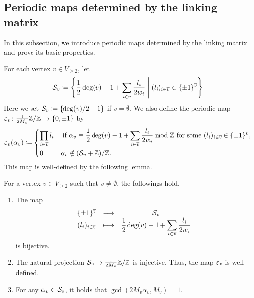 \documentclass[11pt,a4paper,lualatex]{amsart}
\numberwithin{equation}{section} %
\begin{document}
\subsection{Periodic maps determined by the linking matrix} \label{subsec:char}


In this subsection, we introduce periodic maps determined by the linking matrix and prove its basic properties.

For each vertex $ v \in V_{\ge 2} $, let 
\[
\calS_v
\coloneqq
\left\{ \frac{1}{2}\deg(v) - 1 + \sum_{i \in \overline{v}} \frac{l_i}{2w_i} \relmiddle{|} (l_i)_{i \in \overline{v}} \in \{ \pm 1 \}^{\overline{v}} \right\}
\]
Here we set $ \calS_v \coloneqq \left\{ \deg(v)/2 - 1 \right\} $ if $ \overline{v} = \emptyset $.
We also define the periodic map $ \varepsilon_v \colon \frac{1}{2M_v}\mathbb{Z}/\mathbb{Z} \to \{ 0, \pm 1 \} $ by
\[
\veps_v(\alpha_v) \coloneqq 
\begin{dcases}
	\prod_{i \in \overline{v}} l_i 
	& \text{ if } \alpha_v \equiv \frac{1}{2}\deg(v) - 1 + \sum_{i \in \overline{v}} \frac{l_i}{2w_i}  \bmod \Z 
	\text{ for some } (l_i)_{i \in \overline{v}} \in \{ \pm 1 \}^{\overline{v}}, \\
	0 & \alpha_{v} \notin (\calS_v + \Z)/\Z.
\end{dcases}
\]
This map is well-defined by the following lemma.

\begin{lem} \label{lem:bij_calS_v}
	For a vertex $ v \in V_{\ge 2} $ such that $ \overline{v} \neq \emptyset $, the followings hold. 
	\begin{enumerate}
		\item \label{item:lem:bij_calS_v1} The map
		\[
		\begin{array}{ccc}
			\{ \pm 1 \}^{\overline{v}} & \longrightarrow & \mathcal{S}_v \\
			(l_i)_{i \in \overline{v}} & \longmapsto & \displaystyle \frac{1}{2}\deg(v) - 1 + \sum_{i \in \overline{v}} \frac{l_i}{2w_i}
		\end{array}
		\]
		is bijective.
		\item \label{item:lem:bij_calS_v2}
		The natural projection $ \mathcal{S}_v \to \frac{1}{2M_{v}} \mathbb{Z}/\mathbb{Z} $ is injective. 
		Thus, the map $ \varepsilon_v $ is well-defined.
		\item \label{item:lem:bij_calS_v3}
		For any $ \alpha_v \in \mathcal{S}_v $, it holds that $ \gcd(2M_v \alpha_v, M_v) = 1 $.
	\end{enumerate}
\end{lem}
\end{document}
